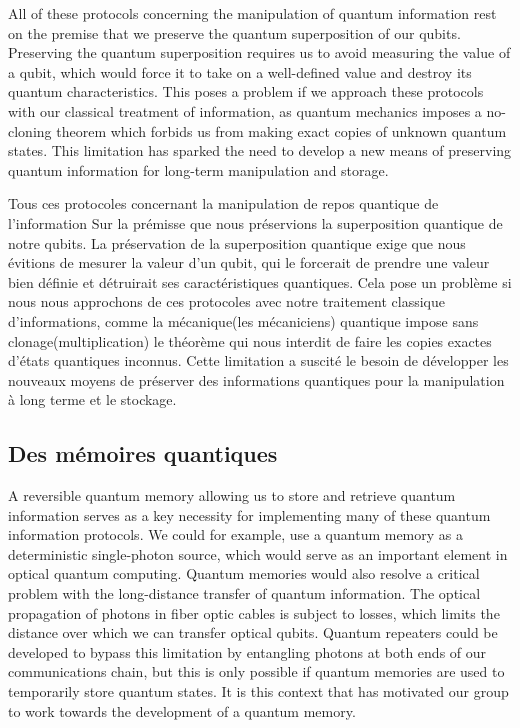 All of these protocols concerning the manipulation of quantum information rest
on the premise that we preserve the quantum superposition of our qubits.  Preserving the quantum superposition requires us to avoid measuring the value of a qubit, which would force it to take on a well-defined value and destroy its quantum characteristics.  This poses a problem if we approach these protocols with our classical treatment of information, as quantum mechanics imposes a no-cloning theorem which forbids us from making exact copies of unknown quantum states.  This limitation has sparked the need to develop a new means of preserving quantum information for long-term manipulation and storage.


 Tous ces protocoles concernant la manipulation de repos quantique de l'information
Sur la prémisse que nous préservions la superposition quantique de notre qubits. La préservation de la superposition quantique exige que nous évitions de mesurer la valeur d'un qubit, qui le forcerait de prendre une valeur bien définie et détruirait ses caractéristiques quantiques. Cela pose un problème si nous nous approchons de ces protocoles avec notre traitement classique d'informations, comme la mécanique(les mécaniciens) quantique impose sans clonage(multiplication) le théorème qui nous interdit de faire les copies exactes d'états quantiques inconnus. Cette limitation a suscité le besoin de développer les nouveaux moyens de préserver des informations quantiques pour la manipulation à long terme et le stockage.




\subsection*{Des mémoires quantiques}

A reversible quantum memory allowing us to store and retrieve quantum
information serves as a key necessity for implementing many of these quantum
information protocols.  We could for example, use a quantum memory as a
deterministic single-photon source, which would serve as an important element
in optical quantum computing.  Quantum memories would also resolve a critical
problem with the long-distance transfer of quantum information.  The optical
propagation of photons in fiber optic cables is subject to losses, which limits the
distance over which we can transfer optical qubits.  Quantum repeaters could
be developed to bypass this limitation by entangling photons at both ends of
our communications chain, but this is only possible if quantum memories are
used to temporarily store quantum states.  It is this context that has
motivated our group to work towards the development of a quantum memory.

